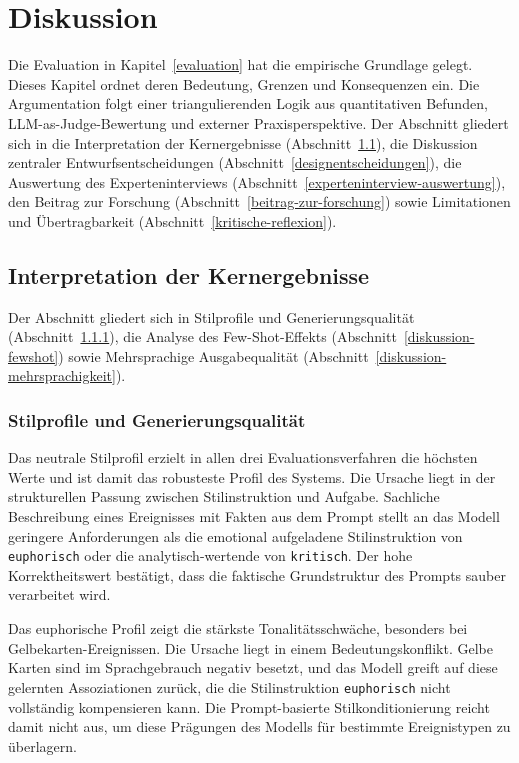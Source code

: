 \chapter{Diskussion}\label{diskussion}

Die Evaluation in Kapitel~\ref{evaluation} hat die empirische Grundlage gelegt. Dieses Kapitel ordnet deren Bedeutung, Grenzen und Konsequenzen ein. Die Argumentation folgt einer triangulierenden Logik aus quantitativen Befunden, LLM-as-Judge-Bewertung und externer Praxisperspektive. Der Abschnitt gliedert sich in die Interpretation der Kernergebnisse (Abschnitt~\ref{interpretation-kernergebnisse}), die Diskussion zentraler Entwurfsentscheidungen (Abschnitt~\ref{designentscheidungen}), die Auswertung des Experteninterviews (Abschnitt~\ref{experteninterview-auswertung}), den Beitrag zur Forschung (Abschnitt~\ref{beitrag-zur-forschung}) sowie Limitationen und Übertragbarkeit (Abschnitt~\ref{kritische-reflexion}).


\section{Interpretation der Kernergebnisse}\label{interpretation-kernergebnisse}

Der Abschnitt gliedert sich in Stilprofile und Generierungsqualität (Abschnitt~\ref{diskussion-stilprofile}), die Analyse des Few-Shot-Effekts (Abschnitt~\ref{diskussion-fewshot}) sowie Mehrsprachige Ausgabequalität (Abschnitt~\ref{diskussion-mehrsprachigkeit}).

\subsection{Stilprofile und Generierungsqualität}\label{diskussion-stilprofile}

Das neutrale Stilprofil erzielt in allen drei Evaluationsverfahren die höchsten Werte und ist damit das robusteste Profil des Systems. Die Ursache liegt in der strukturellen Passung zwischen Stilinstruktion und Aufgabe. Sachliche Beschreibung eines Ereignisses mit Fakten aus dem Prompt stellt an das Modell geringere Anforderungen als die emotional aufgeladene Stilinstruktion von \texttt{euphorisch} oder die analytisch-wertende von \texttt{kritisch}. Der hohe Korrektheitswert bestätigt, dass die faktische Grundstruktur des Prompts sauber verarbeitet wird.

Das euphorische Profil zeigt die stärkste Tonalitätsschwäche, besonders bei Gelbekarten-Ereignissen. Die Ursache liegt in einem Bedeutungskonflikt. Gelbe Karten sind im Sprachgebrauch negativ besetzt, und das Modell greift auf diese gelernten Assoziationen zurück, die die Stilinstruktion \texttt{euphorisch} nicht vollständig kompensieren kann. Die Prompt-basierte Stilkonditionierung reicht damit nicht aus, um diese Prägungen des Modells für bestimmte Ereignistypen zu überlagern.

